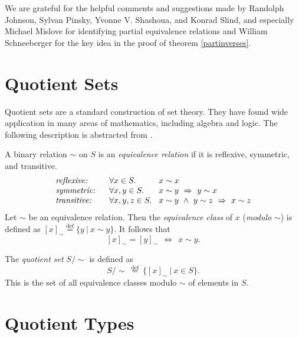 \documentclass[envcountsame,runningheads]{llncs}
\def\defeq{\stackrel{\mathrm{def}}{=}}
\begin{document}
We are grateful for the helpful comments and
suggestions made by
Randolph Johnson,
Sylvan Pinsky,
Yvonne V. Shashoua,
and
Konrad Slind,
and especially Michael Mislove for identifying
partial equivalence relations and
William Schneeberger for the key idea in the proof of theorem
\ref{partinverses}.


%
\section{Quotient Sets}
%
\label{quotientsets}

Quotient sets are a standard construction of set theory. 
They have found wide application in many areas of mathematics,
including algebra and logic.
The following description is abstracted from \cite{End77}.

A binary relation
$\sim$
on $S$ is
an {\it equivalence relation\/}
if it is reflexive, symmetric,  and transitive.
$$
\begin{array}{l@{\hspace{0.6cm}}l@{\hspace{0.3cm}}l}
\mbox{\it reflexive:} &
\forall x \in S. & x \sim x \\
\mbox{\it symmetric:} &
\forall x,y \in S. & x \sim y \ \Rightarrow \ y \sim x \\
\mbox{\it transitive:} &
\forall x,y,z \in S. & x \sim y \ \wedge \ y \sim z \ \Rightarrow \ x \sim z
\end{array}
$$
Let $\sim$ be an equivalence relation.
Then the {\it equivalence class\/} of $x$ ({\it modulo\/} $\sim$)
is defined as $[ x ]_{\sim} \defeq \{ y \ | \ x \sim y \}$.
It follows \cite{End77} that 
$$
[ x ]_{\sim} = [ y ]_{\sim} \ \ \Leftrightarrow \ \ x \sim y .
$$

\noindent
The {\it quotient set\/} $S / \mathbin{\sim}$ is defined as
$$
S / \mathbin{\sim} \ \defeq \ \{ [ x ]_{\sim} \ | \ x \in S \}.
$$
\noindent
This is the set of all equivalence classes modulo $\sim$ of elements in $S$.



%
\section{Quotient Types}
%
\label{quotienttypes}
\end{document}
